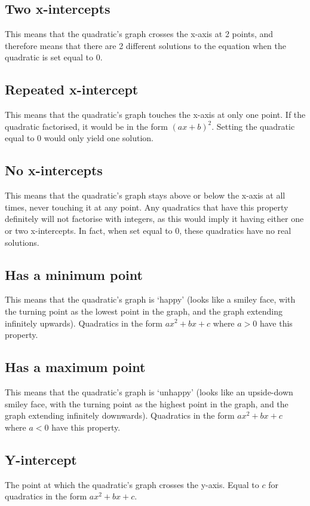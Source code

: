 \subsection{Two x-intercepts}
This means that the quadratic's graph crosses the x-axis at 2 points, and therefore means that there are 2 different solutions to the equation when the quadratic is set equal to 0.

\subsection{Repeated x-intercept}
This means that the quadratic's graph touches the x-axis at only one point. If the quadratic factorised, it would be in the form $(ax+b)^2$. Setting the quadratic equal to 0 would only yield one solution.

\subsection{No x-intercepts}
This means that the quadratic's graph stays above or below the x-axis at all times, never touching it at any point. Any quadratics that have this property definitely will not factorise with integers, as this would imply it having either one or two x-intercepts. In fact, when set equal to 0, these quadratics have no real solutions.

\subsection{Has a minimum point}
This means that the quadratic's graph is `happy' (looks like a smiley face, with the turning point as the lowest point in the graph, and the graph extending infinitely upwards). Quadratics in the form $ax^2+bx+c$ where $a>0$ have this property.

\subsection{Has a maximum point}
This means that the quadratic's graph is `unhappy' (looks like an upside-down smiley face, with the turning point as the highest point in the graph, and the graph extending infinitely downwards). Quadratics in the form $ax^2+bx+c$ where $a<0$ have this property.

\subsection{Y-intercept}
The point at which the quadratic's graph crosses the y-axis. Equal to $c$ for quadratics in the form $ax^2+bx+c$.

